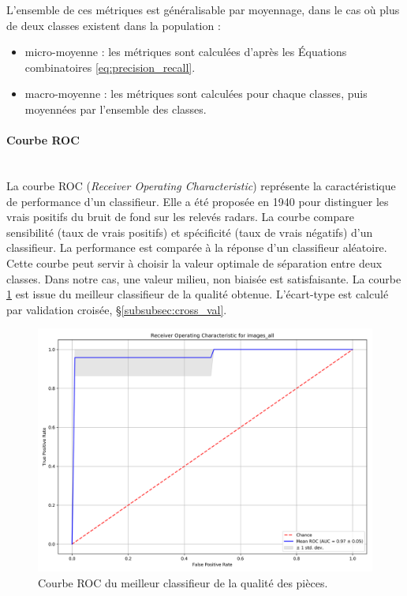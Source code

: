 L'ensemble de ces métriques est généralisable par moyennage, dans le cas où plus de deux classes existent dans la population :
\begin{itemize}
\item micro-moyenne : les métriques sont calculées d'après les Équations combinatoires \ref{eq:precision_recall}.
\item macro-moyenne : les métriques sont calculées pour chaque classes, puis moyennées par l'ensemble des classes.
\end{itemize}

\paragraph{Courbe ROC}\mbox{} \\
La courbe ROC (\textit{Receiver Operating Characteristic}) représente la caractéristique de performance d'un classifieur.
Elle a été proposée en 1940 pour distinguer les vrais positifs du bruit de fond sur les relevés radars.
La courbe compare sensibilité (taux de vrais positifs) et spécificité (taux de vrais négatifs) d'un classifieur.
La performance est comparée à la réponse d'un classifieur aléatoire.
Cette courbe peut servir à choisir la valeur optimale de séparation entre deux classes.
Dans notre cas, une valeur milieu, non biaisée est satisfaisante.
La courbe \ref{fig:roc} est issue du meilleur classifieur de la qualité obtenue.
L'écart-type est calculé par validation croisée, §\ref{subsubsec:cross_val}.

\begin{figure}[hbtp]
    \centering
    \includegraphics[width=\textwidth,height=\textheight,keepaspectratio]{../Chap3/Figures/roc_images_all_224_3cams_densenet_conv4_PCA20.png}
    \caption{Courbe ROC du meilleur classifieur de la qualité des pièces.}
    \label{fig:roc}
\end{figure}

